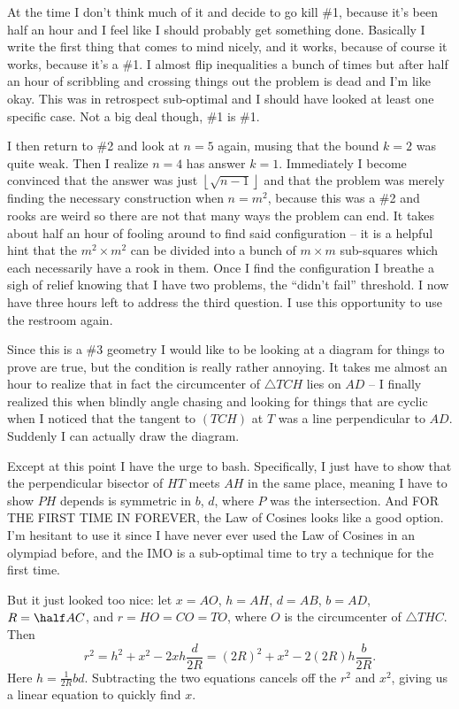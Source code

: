 \documentclass[11pt]{scrreprt}
\numberwithin{figure}{chapter}
\begin{document}
At the time I don't think much of it and decide to go kill \#1, because it's been half an hour and I feel like I should probably get something done.
Basically I write the first thing that comes to mind nicely, and it works, because of course it works, because it's a \#1. I almost flip inequalities
a bunch of times but after half an hour of scribbling and crossing things out the problem is dead and I'm like okay.
This was in retrospect sub-optimal and I should have looked at least one specific case.
Not a big deal though, \#1 is \#1.

I then return to \#2 and look at $n=5$ again, musing that the bound $k=2$ was quite weak.
Then I realize $n=4$ has answer $k=1$.
Immediately I become convinced that the answer was just $\left\lfloor \sqrt{n-1} \right\rfloor$ and that the problem was merely
finding the necessary construction when $n=m^2$, because this was a \#2 and rooks are weird so there are not that many ways
the problem can end.
It takes about half an hour of fooling around to find said configuration -- it is a helpful hint that the $m^2 \times m^2$ can be
divided into a bunch of $m \times m$ sub-squares which each necessarily have a rook in them.
Once I find the configuration I breathe a sigh of relief knowing that I have two problems, the ``didn't fail'' threshold.
I now have three hours left to address the third question.
I use this opportunity to use the restroom again.

Since this is a \#3 geometry I would like to be looking at a diagram for things to prove are true, but the condition is really rather annoying.
It takes me almost an hour to realize that in fact the circumcenter of $\triangle TCH$ lies on $AD$ -- I finally realized this when blindly
angle chasing and looking for things that are cyclic when I noticed that the tangent to $(TCH)$ at $T$ was a line perpendicular to $AD$.
Suddenly I can actually draw the diagram.

Except at this point I have the urge to bash. Specifically, I just have to show that the perpendicular bisector of $HT$ meets $AH$ in the same place, meaning I have to show $PH$ depends is symmetric in $b$, $d$, where $P$ was the intersection.
And FOR THE FIRST TIME IN FOREVER, the Law of Cosines looks like a good option.
I'm hesitant to use it since I have never ever used the Law of Cosines in an olympiad before, and the IMO is a sub-optimal time to try a technique for the first time.

But it just looked too nice: let $x=AO$, $h = AH$, $d=AB$, $b=AD$, $R = \half AC$, and $r=HO=CO=TO$, where $O$ is the circumcenter of $\triangle THC$.  Then
\[ r^2 = h^2 + x^2 - 2xh \frac{d}{2R}
  = (2R)^2 + x^2 - 2(2R)h \frac{b}{2R}. \]
Here $h = \frac{1}{2R} bd$. Subtracting the two equations cancels off the $r^2$ and $x^2$, giving us a linear equation to quickly find $x$.
\end{document}
